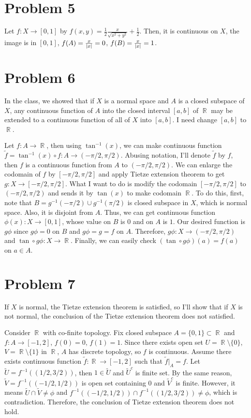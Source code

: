 \documentclass{article}
\DeclareMathOperator{\rr}{\mathbb{R}}
\begin{document}
\section*{Problem 5}
Let $f:X\rightarrow[0,1]$ by $f(x,y)=\frac{1}{2}\frac{x}{\sqrt{x^2+y^2}}+\frac{1}{2}$. Then, it is continuous on $X$, the image is in $[0,1]$, $f(A)=\frac{x}{\abs{x}}=0$, $f(B)=\frac{x}{\abs{x}}=1$.
\section*{Problem 6}
In the class, we showed that if $X$ is a normal space and $A$ is a closed subspace of $X$, any continuous function of $A$ into the closed interval $[a,b]$ of $\rr$ may be extended to a continuous function of all of $X$ into $[a,b]$. I need change $[a,b]$ to $\rr$.

Let $f:A\rightarrow \rr$, then using $\tan^{-1}(x)$, we can make continuous function $\tilde{f}=\tan^{-1}(x)\circ f:A\rightarrow (-\pi/2,\pi/2)$. Abusing notation, I'll denote $\tilde{f}$ by $f$, then $f$ is a continuous function from $A$ to $(-\pi/2,\pi/2)$. We can enlarge the codomain of $f$ by $[-\pi/2,\pi/2]$ and apply Tietze extension theorem to get $g:X\rightarrow [-\pi/2,\pi/2]$. What I want to do is modify the codomain $[-\pi/2,\pi/2]$ to $(-\pi/2,\pi/2)$ and sends it by $\tan(x)$ to make codomain $\rr$. To do this, first, note that $B=g^{-1}(-\pi/2)\cup g^{-1}(\pi/2)$ is closed subspace in $X$, which is normal space. Also, it is disjoint from $A$. Thus, we can get continuous function $\phi(x):X\rightarrow [0,1]$, whose value on $B$ is $0$ and on $A$ is $1$. Our desired function is $g\phi$ since $g\phi=0$ on $B$ and $g\phi=g=f$ on $A$. Therefore, $g\phi:X\rightarrow (-\pi/2,\pi/2)$ and $\tan \circ g\phi:X\rightarrow \rr$. Finally, we can easily check $\left(\tan \circ g\phi\right)(a)=f(a)$ on $a\in A$.
\section*{Problem 7}
If $X$ is normal, the Tietze extension theorem is satisfied, so I'll show that if $X$ is not normal, the conclusion of the Tietze extension theorem does not satisfied.

Consider $\rr$ with co-finite topology. Fix closed subspace $A=\{0,1\}\subset \rr$ and $f:A\rightarrow[-1, 2]$, $f(0)=0$, $f(1)=1$. Since there exists open set $U=\rr\setminus\{0\}$, $V=\rr\setminus\{1\}$ in $\rr$, $A$ has discrete topology, so $f$ is continuous. Assume there exists continuous function $\tilde{f}:\rr\rightarrow[-1,2]$ such that $\tilde{f}|_A=f$. Let $\tilde{U}=f^{-1}((1/2, 3/2))$, then $1\in \tilde{U}$ and $\tilde{U}^c$ is finite set. By the same reason, $\tilde{V}=f^{-1}((-1/2, 1/2))$ is open set containing $0$ and $\tilde{V}^c$ is finite. However, it means $\tilde{U}\cap \tilde{V}\neq \phi$ and $f^{-1}((-1/2, 1/2))\cap f^{-1}((1/2, 3/2))\neq \phi$, which is contradiction. Therefore, the conclusion of Tietze extension theorem does not hold.
\end{document}
